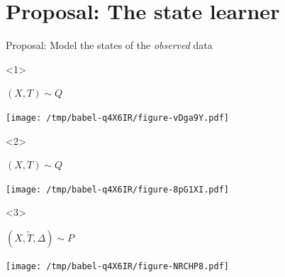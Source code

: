\documentclass[smaller]{beamer}\usepackage{listings}
\begin{document}
\section{Proposal: The state learner}
\label{sec:orgc404b90}
\begin{frame}[label={sec:orge08b0a2}]{Proposal: Model the states of the \emph{observed} data}
\begin{onlyenv}<1>
\begin{block}{\centering \color{white} \((X, T) \sim Q\)}
\begin{center}
\texttt{[image: /tmp/babel-q4X6IR/figure-vDga9Y.pdf]}
\end{center}
\end{block}
\end{onlyenv}

\begin{onlyenv}<2>
\begin{block}{\centering \((X, T) \sim Q\)}
\begin{center}
\texttt{[image: /tmp/babel-q4X6IR/figure-8pG1XI.pdf]}
\end{center}
\end{block}
\end{onlyenv}

\begin{onlyenv}<3>
\begin{block}{\centering \color{darkgray}\((X, \tilde T, \Delta) \sim P\)\color{black}}
\begin{center}
\texttt{[image: /tmp/babel-q4X6IR/figure-NRCHP8.pdf]}
\end{center}
\end{block}
\end{onlyenv}
\end{frame}
\end{document}
